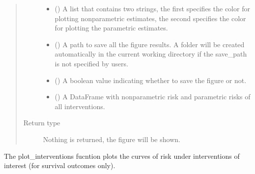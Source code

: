 \documentclass[letterpaper,10pt,english]{sphinxmanual}
\begin{document}
\begin{fulllineitems}
\begin{quote}
\begin{description}
\begin{itemize}
\item {} 
\sphinxAtStartPar
{} () \textendash{} A list that contains two strings, the first specifies the color for plotting nonparametric estimates, the second
specifies the color for plotting the parametric estimates.

\item {} 
\sphinxAtStartPar
{} () \textendash{} A path to save all the figure results. A folder will be created automatically in the current working directory
if the save\_path is not specified by users.

\item {} 
\sphinxAtStartPar
{} () \textendash{} A boolean value indicating whether to save the figure or not.

\item {} 
\sphinxAtStartPar
{} () \textendash{} A DataFrame with nonparametric risk and parametric risks of all interventions.

\end{itemize}

\item[{Return type}] \leavevmode
\sphinxAtStartPar
Nothing is returned, the figure will be shown.

\end{description}\end{quote}

\end{fulllineitems}


\sphinxAtStartPar
The plot\_interventions fucntion plots the curves of risk under interventions of interest (for survival outcomes only).
\end{document}
